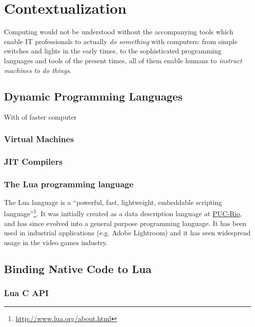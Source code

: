 
\chapter{Contextualization}

Computing would not be understood without the accompanying tools which enable
IT professionals to actually \emph{do something} with computers: from simple
switches and lights in the early times, to the sophisticated programming
languages and tools of the present times, all of them enable humans to
\emph{instruct machines to do things}.


\section{Dynamic Programming Languages}

With  of faster computer


\subsection{Virtual Machines}

\subsection{JIT Compilers}


\subsection{The Lua programming language}

The Lua language is a “powerful, fast, lightweight, embeddable scripting
language”\footnote{\url{http://www.lua.org/about.html}}. It was initially
created as a data description language at
\href{http://www.puc-rio.br/}{PUC-Rio}, and has since evolved into a general
purpose programming language. It has been used in industrial applications
(e.g. Adobe Lightroom) and it has seen widespread usage in the video games
industry.

\section{Binding Native Code to Lua}

\subsection{Lua C API}
	\label{sec:lua-c-api}


